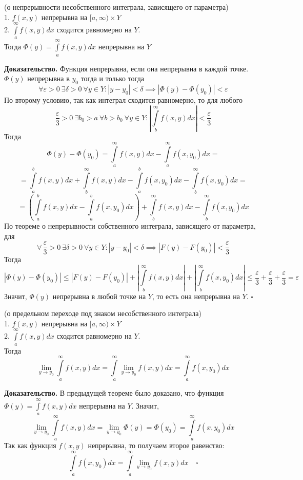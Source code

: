 \begin{theor}
    (о непрерывности несобственного интеграла, зависящего от параметра)\\
    1. $f(x,y)$ непрерывна на  $[a,\infty)\times Y$\\
    2. $\int\limits_{a}^{\infty} f(x,y)dx$ сходится равномерно на $Y$.\\
    Тогда  $\Phi(y)=\int\limits_{a}^{\infty} f(x,y)dx$ непрерывна на $Y$
\end{theor}
\textbf{Доказательство.} 
Функция непрерывна, если она непрерывна в каждой точке. 
$\Phi(y)$ непрерывна в  $y_0$ тогда и только тогда
$$\forall \varepsilon>0~\exists \delta>0~\forall y\in Y:
|y-y_0|<\delta \implies |\Phi(y)-\Phi(y_0)|<\varepsilon$$
По второму условию, так как интеграл сходится равномерно, то
для любого 
 $$\frac{\varepsilon}{3}>0~\exists b_0>a~\forall b>b_0~\forall y\in Y:
\left|\int\limits_{b}^{\infty} f(x,y)dx\right|<\frac{\varepsilon}{3}
 $$
Тогда 
$$
\Phi(y)-\Phi(y_0)=\int\limits_{a}^{\infty} f(x,y)dx-
\int\limits_{a}^{\infty} f(x,y_0)dx=
$$
$$
=\int\limits_{a}^{b} f(x,y)dx+ \int\limits_{b}^{\infty}f(x,y)dx -
\int\limits_{a}^{b} f(x,y_0)dx -\int\limits_{b}^{\infty}f(x,y_0)dx=
$$
$$
=\left( \int\limits_{a}^{b} f(x,y)dx-\int\limits_{a}^{b} f(x,y_0)dx\right) +
\int\limits_{b}^{\infty}f(x,y)dx-\int\limits_{b}^{\infty}f(x,y_0)dx
$$
По теореме о непрерывности собственного интеграла, зависящего от параметра, 
для
$$
\forall\,\frac{\varepsilon}{3}>0~\exists \delta>0~\forall y\in Y:
|y-y_0|<\delta \implies |F(y)-F(y_0)|<\frac{\varepsilon}{3}
$$
Тогда 
$$|\Phi(y)-\Phi(y_0)|\leqslant |F(y)-F(y_0)|+ 
\left|\int\limits_{b}^{\infty}f(x,y)dx  \right| + 
\left|\int\limits_{b}^{\infty}f(x,y_0)dx \right|\leqslant 
\frac{\varepsilon}{3}+\frac{\varepsilon}{3}+\frac{\varepsilon}{3}=
\varepsilon$$
Значит, $\Phi(y)$ непрерывна в любой точке на $Y$, то есть она непрерывна
на $Y$. $\square$ 

\begin{theor}
    (о предельном переходе под знаком несобственного интеграла)\\
    1. $f(x,y)$ непрерывна на  $[a,\infty)\times Y$\\
    2. $\int\limits_{a}^{\infty} f(x,y)dx$ сходится равномерно на $Y$.\\
    Тогда  
$$\lim\limits_{y \to y_0}\int\limits_{a}^{\infty} f(x,y)dx=
\int\limits_{a}^{\infty} \lim\limits_{y \to y_0}f(x,y)dx = 
\int\limits_{a}^{\infty}f(x,y_0)dx$$
\end{theor}
\textbf{Доказательство.} В предыдущей теореме было доказано, что 
функция $\Phi(y)=\int\limits_{a}^{\infty} f(x,y)dx$ непрерывна на $Y$. 
Значит, 
$$\lim\limits_{y \to y_0}\int\limits_{a}^{\infty} f(x,y)dx=
\lim\limits_{y \to y_0} \Phi(y) = \Phi(y_0) = 
\int\limits_{a}^{\infty}f(x,y_0)dx$$
Так как функция $f(x,y)$ непрерывна, то получаем второе равенство:
$$\int\limits_{a}^{\infty}f(x,y_0)dx = 
\int\limits_{a}^{\infty}\lim\limits_{y \to y_0} f(x,y)dx\quad\square$$




